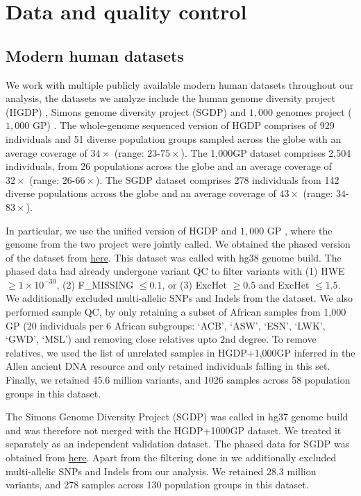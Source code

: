 \section{Data and quality control}
\label{sec:ch2-gb-data}
\subsection{Modern human datasets}

We work with multiple publicly available modern human datasets throughout our analysis, the datasets we analyze include the human genome diversity project (HGDP) \cite{cann2002human, bergstrom2020insights}, Simons genome diversity project (SGDP) \cite{mallick2016simons} and $1{,}000$ genomes project ($1{,}000$ GP) \cite{sudmant2015integrated, 10002015global}.
%
The whole-genome sequenced version of HGDP \cite{bergstrom2020insights} comprises of 929 individuals and 51 diverse population groups sampled across the globe with an average coverage of $34 \times$ (range: $23$-$75 \times$).
%
The 1,000GP dataset comprises 2,504 individuals, from 26 populations across the globe and an average coverage of $32 \times$ (range: $26$-$66 \times$).
%
The SGDP dataset comprises 278 individuals from 142 diverse populations across the globe and an average coverage of $43 \times$ (range: $34$-$83 \times$).

In particular, we use the unified version of HGDP and $1{,}000$ GP \cite{koenig2024harmonized}, where the genome from the two project were jointly called. 
%
We obtained the phased version of the dataset from \href{gs://gcp-public-data‐‐gnomad/resources/hgdp_1kg/phased_haplotypes_v2/}{here}. This dataset was called with hg38 genome build.
%
The phased data had already undergone variant QC to filter variants with (1) HWE $\geq 1 \times 10^{-30}$, (2) F\_MISSING $\leq 0.1$, or (3) ExcHet $\geq 0.5$ and ExcHet $\leq 1.5$. 
%
We additionally excluded multi-allelic SNPs and Indels from the dataset.
%
We also performed sample QC, by only retaining a subset of African samples from 1,000 GP (20 individuals per 6 African subgroups: `ACB', `ASW', `ESN', `LWK', `GWD', `MSL') and removing close relatives upto 2nd degree.
%
To remove relatives, we used the list of unrelated samples in HGDP+1,000GP inferred in the Allen ancient DNA resource \cite{mallick2024allen} and only retained individuals falling in this set.
%
Finally, we retained 45.6 million variants, and 1026 samples across 58 population groups in this dataset. 


The Simons Genome Diversity Project (SGDP) was called in hg37 genome build and was therefore not merged with the HGDP+1000GP dataset. 
%
We treated it separately as an independent validation dataset.
%
The phased data for SGDP was obtained from \href{https://sharehost.hms.harvard.edu/genetics/reich_lab/sgdp/phased_data.knownbugs.not_recommended.please_use_newer_dataset_instead/}{here}. 
%
Apart from the filtering done in \cite{mallick2016simons} we additionally excluded multi-allelic SNPs and Indels from our analysis. 
%
We retained 28.3 million variants, and 278 samples across 130 population groups in this dataset.

